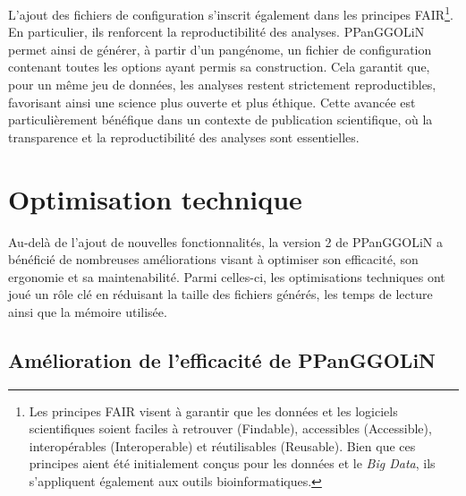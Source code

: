 L’ajout des fichiers de configuration s’inscrit également dans les principes FAIR\footnote{Les principes FAIR visent à garantir que les données et les logiciels scientifiques soient faciles à retrouver (Findable), accessibles (Accessible), interopérables (Interoperable) et réutilisables (Reusable). Bien que ces principes aient été initialement conçus pour les données et le \textit{Big Data}, ils s’appliquent également aux outils bioinformatiques.}. En particulier, ils renforcent la reproductibilité des analyses. PPanGGOLiN permet ainsi de générer, à partir d’un pangénome, un fichier de configuration contenant toutes les options ayant permis sa construction. Cela garantit que, pour un même jeu de données, les analyses restent strictement reproductibles, favorisant ainsi une science plus ouverte et plus éthique. Cette avancée est particulièrement bénéfique dans un contexte de publication scientifique, où la transparence et la reproductibilité des analyses sont essentielles.

\newpage

\section{Optimisation technique}

Au-delà de l’ajout de nouvelles fonctionnalités, la version 2 de PPanGGOLiN a bénéficié de nombreuses améliorations visant à optimiser son efficacité, son ergonomie et sa maintenabilité. Parmi celles-ci, les optimisations techniques ont joué un rôle clé en réduisant la taille des fichiers générés, les temps de lecture ainsi que la mémoire utilisée.

\subsection{Amélioration de l'efficacité de PPanGGOLiN}

